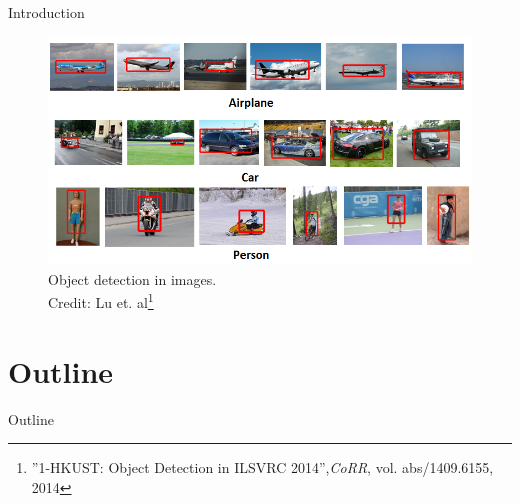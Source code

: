 \documentclass{beamer}
\begin{document}
	\begin{frame}{Introduction}
		\begin{figure}
			\includegraphics[scale=.5]{img/ilsvrc}
			\caption{Object detection in images. \\Credit: Lu et. al\footnote{''1-HKUST: Object Detection in {ILSVRC} 2014'',\textit{CoRR}, vol. abs/1409.6155, 2014}}
				
		\end{figure}
	\end{frame}
	\section*{Outline}
	\begin{frame}{Outline}
		\tableofcontents
	\end{frame}
\end{document}
